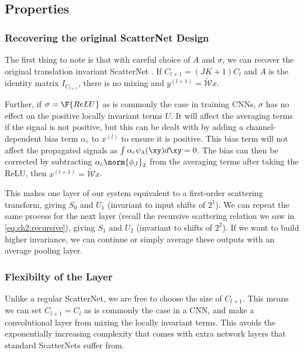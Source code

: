 \subsection{Properties}
\subsubsection{Recovering the original ScatterNet Design}
The first thing to note is that with careful choice of $A$ and $\sigma$, we can
recover the original translation invariant ScatterNet
\cite{bruna_invariant_2013, oyallon_scaling_2017}. If $C_{l+1} = (JK+1)C_l$ 
and $A$ is the identity matrix $I_{C_{l+1}}$, there is no mixing and $y^{(l+1)} = \widetilde{\mathcal{W}}x$.

Further, if $\sigma = \F{ReLU}$ as is commonly the case in training CNNs,
$\sigma$ has no effect on the positive locally invariant terms $U$. It will affect the averaging terms
if the signal is not positive, but this can be dealt with by adding a channel-dependent 
bias term $\alpha_c$ to $x^{(l)}$ to ensure it is positive. This bias term
will not affect the propagated signals as $\int \alpha_c \psi_\lambda(\xy) d\xy =
0$. The bias can then be corrected by subtracting $\alpha_c \norm{\phi_J}_2$ from
the averaging terms after taking the ReLU, then $x^{(l+1)} =
\widetilde{\mathcal{W}}x$.

This makes one layer of our system equivalent to a first-order scattering
transform, giving $S_0$ and $U_1$ (invariant to input shifts of $2^1$). We can repeat
the same process for the next layer (recall the recursive scattering relation we
saw in \eqref{eq:ch2:recursive}),
giving $S_1$ and $U_2$ (invariant to shifts of $2^2$). If we want to build
higher invariance, we can continue or simply average these outputs with an average pooling
layer.

\subsubsection{Flexibilty of the Layer}
Unlike a regular ScatterNet, we are free to choose the size of $C_{l+1}$. This
means we can set $C_{l+1} = C_{l}$ as is commonly the case in a CNN, and make a
convolutional layer from mixing the locally invariant terms. This avoids the
exponentially increasing complexity that comes with extra network layers that 
standard ScatterNets suffer from.

